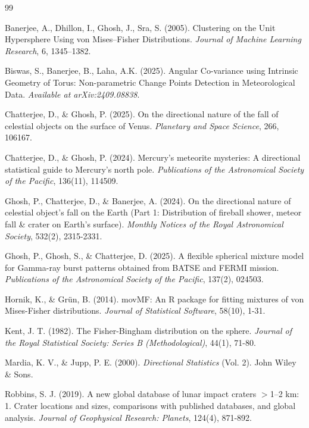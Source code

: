 \documentclass[12pt,a4paper]{report}
\begin{document}
\clearpage
\renewcommand{\bibname}{References}
\begin{thebibliography}{99}

Banerjee, A., Dhillon, I., Ghosh, J., Sra, S. (2005). Clustering on the Unit Hypersphere Using von Mises–Fisher Distributions. \textit{Journal of Machine Learning Research}, 6, 1345–1382.

Biswas, S., Banerjee, B., Laha, A.K. (2025). Angular Co-variance using Intrinsic Geometry of Torus: Non-parametric Change Points Detection in Meteorological Data. \textit{Available at arXiv:2409.08838}.

Chatterjee, D., \& Ghosh, P. (2025). On the directional nature of the fall of celestial objects on the surface of Venus. \textit{Planetary and Space Science}, 266, 106167.

Chatterjee, D., \& Ghosh, P. (2024). Mercury’s meteorite mysteries: A directional statistical guide to Mercury’s north pole. \textit{Publications of the Astronomical Society of the Pacific}, 136(11), 114509.

Ghosh, P., Chatterjee, D., \& Banerjee, A. (2024). On the directional nature of celestial object's fall on the Earth (Part 1: Distribution of fireball shower, meteor fall \& crater on Earth’s surface). \textit{Monthly Notices of the Royal Astronomical Society}, 532(2), 2315-2331.

Ghosh, P., Ghosh, S., \& Chatterjee, D. (2025). A flexible spherical mixture model for Gamma-ray burst patterns obtained from BATSE and FERMI mission. \textit{Publications of the Astronomical Society of the Pacific}, 137(2), 024503.

Hornik, K., \& Grün, B. (2014). movMF: An R package for fitting mixtures of von Mises-Fisher distributions. \textit{Journal of Statistical Software}, 58(10), 1-31.

Kent, J. T. (1982). The Fisher-Bingham distribution on the sphere. \textit{Journal of the Royal Statistical Society: Series B (Methodological)}, 44(1), 71-80.

Mardia, K. V., \& Jupp, P. E. (2000). \textit{Directional Statistics} (Vol. 2). John Wiley \& Sons.

Robbins, S. J. (2019). A new global database of lunar impact craters $>$1--2 km: 1. Crater locations and sizes, comparisons with published databases, and global analysis. \textit{Journal of Geophysical Research: Planets}, 124(4), 871-892.

\end{thebibliography}
\end{document}
